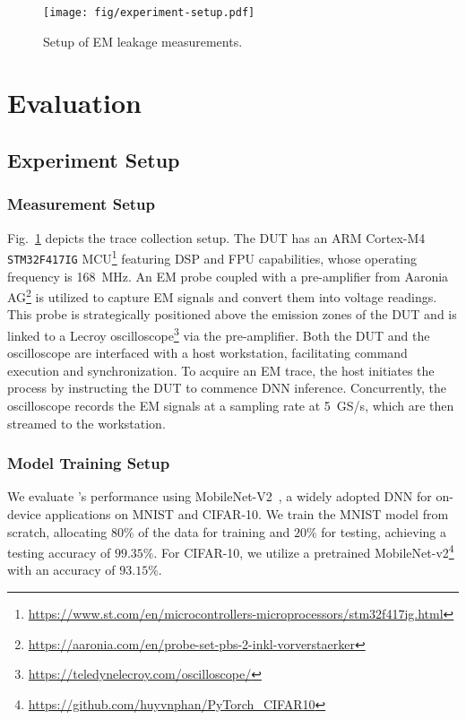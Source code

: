 \begin{figure}[t]
    \centering
    \texttt{[image: fig/experiment-setup.pdf]}
    \caption{Setup of EM leakage measurements.}
    \label{fig: experiment setup}
\end{figure}

\section{Evaluation}

\subsection{Experiment Setup} \label{sec: exp: setup}
\subsubsection{Measurement Setup}
Fig.~\ref{fig: experiment setup} depicts the trace collection setup.
The DUT has an ARM Cortex-M4 \verb|STM32F417IG| MCU\footnote{\url{https://www.st.com/en/microcontrollers-microprocessors/stm32f417ig.html}} featuring DSP and FPU capabilities, whose operating frequency is 168~\unit{MHz}.
An EM probe coupled with a pre-amplifier from Aaronia AG\footnote{\url{https://aaronia.com/en/probe-set-pbs-2-inkl-vorverstaerker}} is utilized to capture EM signals and convert them into voltage readings.
This probe is strategically positioned above the emission zones of the DUT and is linked to a Lecroy oscilloscope\footnote{\url{https://teledynelecroy.com/oscilloscope/}} via the pre-amplifier.
Both the DUT and the oscilloscope are interfaced with a host workstation, facilitating command execution and synchronization.
To acquire an EM trace, the host initiates the process by instructing the DUT to commence DNN inference.
Concurrently, the oscilloscope records the EM signals at a sampling rate at 5~\unit{GS/s}, which are then streamed to the workstation.
\subsubsection{Model Training Setup}
We evaluate \method's performance using MobileNet-V2~\cite{sandler2018mobilenetv2}, a widely adopted DNN for on-device applications on MNIST and CIFAR-10.
We train the MNIST model from scratch, allocating $80\%$ of the data for training and $20\%$ for testing, achieving a testing accuracy of $99.35\%$.
For CIFAR-10, we utilize a pretrained MobileNet-v2\footnote{\url{https://github.com/huyvnphan/PyTorch_CIFAR10}} with an accuracy of $93.15\%$.






